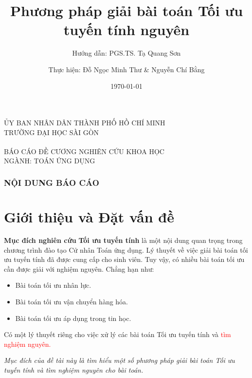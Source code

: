 \documentclass[10pt]{beamer}
\title{Phương pháp giải bài toán Tối ưu tuyến tính nguyên}
\date{\today}
\author{Thực hiện: Đỗ Ngọc Minh Thư \& Nguyễn Chí Bằng}
\institute{Sinh viên lớp: DTU1221, Khóa: 22 @ Đại học Sài Gòn}
\subtitle{Hướng dẫn: PGS.TS. Tạ Quang Sơn}
\begin{document}
\begin{frame}
  \centering
  {\footnotesize
  ỦY BAN NHÂN DÂN THÀNH PHỐ HỒ CHÍ MINH\\
  TRƯỜNG ĐẠI HỌC SÀI GÒN}\\
  \phantom{space}\\
  {\normalsize BÁO CÁO ĐỀ CƯƠNG NGHIÊN CỨU KHOA HỌC\\
  NGÀNH: TOÁN ỨNG DỤNG}\\[-50pt]
  \titlepage
\end{frame}

\begin{frame}
    \frametitle{NỘI DUNG BÁO CÁO}
    \tableofcontents
\end{frame}

\section{Giới thiệu và Đặt vấn đề}

\begin{frame}{\bf Mục đích nghiên cứu}
\textbf{Tối ưu tuyến tính} là một nội dung quan trọng trong chương trình đào tạo Cử nhân Toán ứng dụng. Lý thuyết về việc giải bài toán tối ưu tuyến tính đã được cung cấp cho sinh viên. Tuy vậy, có nhiều bài toán tối ưu cần được giải với nghiệm nguyên. Chẳng hạn như:
\begin{itemize}
\item Bài toán tối ưu nhân lực.
\item Bài toán tối ưu vận chuyển hàng hóa.
\item Bài toán tối ưu áp dụng trong tin học.
\end{itemize}

\bigskip
Có một lý thuyết riêng cho việc xử lý các bài toán Tối ưu tuyến tính và \textcolor{red}{tìm nghiệm nguyên.}
\bigskip

{\it Mục đích của đề tài này là tìm hiểu một số phương pháp giải bài toán Tối ưu tuyến tính và tìm nghiệm nguyên cho bài toán.}
\end{frame}
\end{document}
